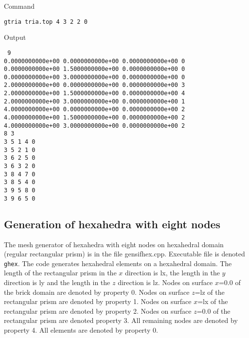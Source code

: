 \documentclass[12pt]{book}
\begin{document}
\noindent
Command

{\tt gtria tria.top 4 3 2 2 0}

\noindent
Output

\noindent
{\tt
9\\
0.0000000000e+00 0.0000000000e+00 0.0000000000e+00 0\\
0.0000000000e+00 1.5000000000e+00 0.0000000000e+00 0\\
0.0000000000e+00 3.0000000000e+00 0.0000000000e+00 0\\
2.0000000000e+00 0.0000000000e+00 0.0000000000e+00 3\\
2.0000000000e+00 1.5000000000e+00 0.0000000000e+00 4\\
2.0000000000e+00 3.0000000000e+00 0.0000000000e+00 1\\
4.0000000000e+00 0.0000000000e+00 0.0000000000e+00 2\\
4.0000000000e+00 1.5000000000e+00 0.0000000000e+00 2\\
4.0000000000e+00 3.0000000000e+00 0.0000000000e+00 2\\
8 3\\
3 5 1 4 0\\
3 5 2 1 0\\
3 6 2 5 0\\
3 6 3 2 0\\
3 8 4 7 0\\
3 8 5 4 0\\
3 9 5 8 0\\
3 9 6 5 0\\
}





\subsection{Generation of hexahedra with eight nodes}

The mesh generator of hexahedra with eight nodes on hexahedral domain (regular rectangular prism) is in the file gensifhex.cpp.
Executable file is denoted {\tt ghex}. The code generates hexahedral elements on a hexahedral domain.
The length of the rectangular prism in the $x$ direction is lx, the length in the $y$ direction is ly and
the length in the $z$ direction is lz. Nodes on surface $x$=0.0 of the brick domain are denoted by property 0.
Nodes on surface $z$=lz of the rectangular prism are denoted by property 1.
Nodes on surface $x$=lx of the rectangular prism are denoted by property 2.
Nodes on surface $z$=0.0 of the rectangular prism are denoted property 3.
All remaining nodes are denoted by property 4.
All elements are denoted by property 0.
\end{document}
